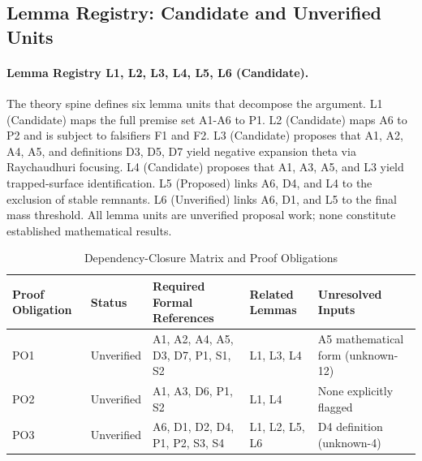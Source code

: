 \documentclass[conference]{IEEEtran}
\begin{document}
\subsection{Lemma Registry: Candidate and Unverified Units}
\paragraph{Lemma Registry L1, L2, L3, L4, L5, L6 (Candidate).} The theory spine defines six lemma units that decompose the argument. L1 (Candidate) maps the full premise set A1-A6 to P1. L2 (Candidate) maps A6 to P2 and is subject to falsifiers F1 and F2. L3 (Candidate) proposes that A1, A2, A4, A5, and definitions D3, D5, D7 yield negative expansion theta via Raychaudhuri focusing. L4 (Candidate) proposes that A1, A3, A5, and L3 yield trapped-surface identification. L5 (Proposed) links A6, D4, and L4 to the exclusion of stable remnants. L6 (Unverified) links A6, D1, and L5 to the final mass threshold. All lemma units are unverified proposal work; none constitute established mathematical results.

\begin{table}[htbp]
\centering
\footnotesize
\setlength{\tabcolsep}{3pt}
\renewcommand{\arraystretch}{1.12}
\caption{Dependency-Closure Matrix and Proof Obligations}
\label{tab:definitions-and-propositions-dp-07}
\begin{tabular}{|p{}|p{}|p{}|p{}|p{}|}
\hline
Proof Obligation & Status & Required Formal References & Related Lemmas & Unresolved Inputs \\\hline
PO1 & Unverified & A1, A2, A4, A5, D3, D7, P1, S1, S2 & L1, L3, L4 & A5 mathematical form (unknown-12) \\\hline
PO2 & Unverified & A1, A3, D6, P1, S2 & L1, L4 & None explicitly flagged \\\hline
PO3 & Unverified & A6, D1, D2, D4, P1, P2, S3, S4 & L1, L2, L5, L6 & D4 definition (unknown-4) \\\hline
\end{tabular}
\end{table}
\end{document}
